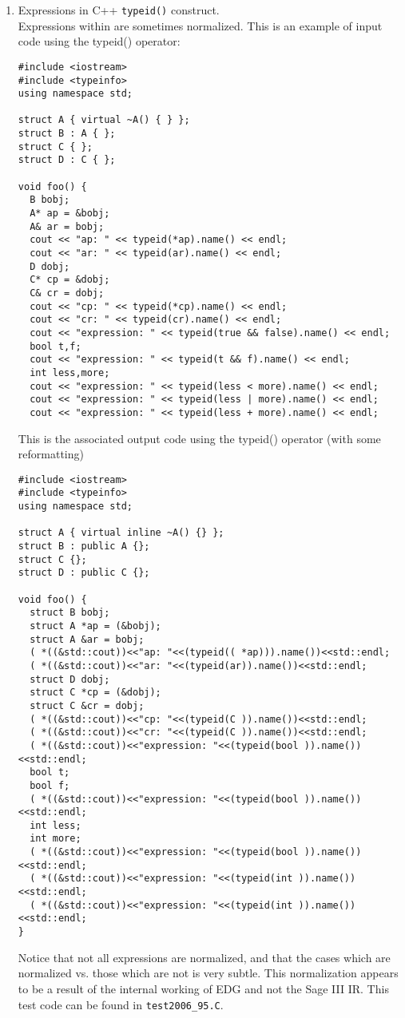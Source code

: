 \begin{enumerate}
\item Expressions in C++ {\tt typeid()} construct. \\
   Expressions within are sometimes normalized.
This is an example of input code using the typeid() operator:
{\indent
{\mySmallFontSize
\begin{verbatim}
#include <iostream>
#include <typeinfo>
using namespace std;

struct A { virtual ~A() { } };
struct B : A { };
struct C { };
struct D : C { };

void foo() {
  B bobj;
  A* ap = &bobj;
  A& ar = bobj;
  cout << "ap: " << typeid(*ap).name() << endl;
  cout << "ar: " << typeid(ar).name() << endl;
  D dobj;
  C* cp = &dobj;
  C& cr = dobj;
  cout << "cp: " << typeid(*cp).name() << endl;
  cout << "cr: " << typeid(cr).name() << endl;
  cout << "expression: " << typeid(true && false).name() << endl;
  bool t,f;
  cout << "expression: " << typeid(t && f).name() << endl;
  int less,more;
  cout << "expression: " << typeid(less < more).name() << endl;
  cout << "expression: " << typeid(less | more).name() << endl;
  cout << "expression: " << typeid(less + more).name() << endl;
\end{verbatim}
}}

This is the associated output code using the typeid() operator 
(with some reformatting)
{\indent
{\mySmallFontSize
\begin{verbatim}
#include <iostream>
#include <typeinfo>
using namespace std;

struct A { virtual inline ~A() {} };
struct B : public A {};
struct C {};
struct D : public C {};

void foo() {
  struct B bobj;
  struct A *ap = (&bobj);
  struct A &ar = bobj;
  ( *((&std::cout))<<"ap: "<<(typeid(( *ap))).name())<<std::endl;
  ( *((&std::cout))<<"ar: "<<(typeid(ar)).name())<<std::endl;
  struct D dobj;
  struct C *cp = (&dobj);
  struct C &cr = dobj;
  ( *((&std::cout))<<"cp: "<<(typeid(C )).name())<<std::endl;
  ( *((&std::cout))<<"cr: "<<(typeid(C )).name())<<std::endl;
  ( *((&std::cout))<<"expression: "<<(typeid(bool )).name())<<std::endl;
  bool t;
  bool f;
  ( *((&std::cout))<<"expression: "<<(typeid(bool )).name())<<std::endl;
  int less;
  int more;
  ( *((&std::cout))<<"expression: "<<(typeid(bool )).name())<<std::endl;
  ( *((&std::cout))<<"expression: "<<(typeid(int )).name())<<std::endl;
  ( *((&std::cout))<<"expression: "<<(typeid(int )).name())<<std::endl;
}
\end{verbatim}
}}

  Notice that not all expressions are normalized, and that the cases 
which are normalized vs. those which are not is very subtle. This 
normalization appears to be a result of the internal working of EDG 
and not the Sage III IR.  This test code can be found in {\tt test2006\_95.C}.

\end{enumerate}


